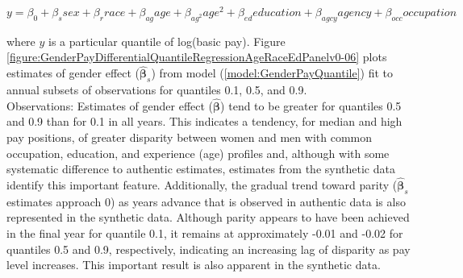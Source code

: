 \documentclass[10pt, letterpaper]{article}
\newcommand{\mest}[1]{\hat{\bm{#1}}}
\begin{document}
\begin{spacing}{1.0}
\begin{equation} y=\beta_0+\beta_ssex+\beta_rrace+\beta_{ag}age+\beta_{ag^2}age^2+\beta_{ed}education+\beta_{agcy}agency+\beta_{occ}occupation
\label{model:GenderPayQuantile}
\end{equation}

where $y$ is a particular quantile of log(basic pay).  Figure \ref{figure:GenderPayDifferentialQuantileRegressionAgeRaceEdPanelv0-06} plots estimates of gender effect ($\mest{\beta}_s$) from model (\ref{model:GenderPayQuantile}) fit to annual subsets of observations for quantiles 0.1, 0.5, and 0.9.\\

Observations:  Estimates of gender effect ($\mest{\beta}$) tend to be greater for quantiles 0.5 and 0.9 than for 0.1 in all years.  This indicates a tendency, for median and high pay positions, of greater disparity between women and men with common occupation, education, and experience (age) profiles and, although with some systematic difference to authentic estimates, estimates from the synthetic data identify this important feature.  Additionally, the gradual trend toward parity ($\mest{\beta}_s$ estimates approach 0) as years advance that is observed in authentic data is also represented in the synthetic data.  Although parity appears to have been achieved in the final year for quantile 0.1, it remains at approximately -0.01 and -0.02 for quantiles 0.5 and 0.9, respectively, indicating an increasing lag of disparity as pay level increases.  This important result is also apparent in the synthetic data.


\end{spacing}
\end{document}

